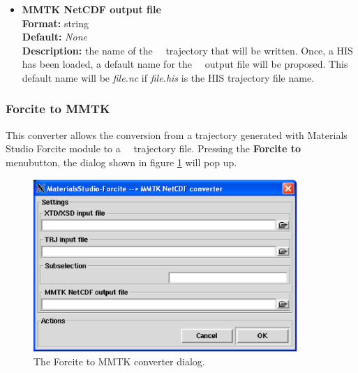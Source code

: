 \documentclass[a4paper,11pt]{report}
\begin{document}
\begin{itemize}
\item \textbf{MMTK NetCDF output file}\\
\textbf{Format:} string\\
\textbf{Default:} \textit{None}\\
\textbf{Description:} the name of the \MMTK\ \NetCDF\ trajectory that will be written. Once, a HIS has been 
loaded, a default name for the \MMTK\ \NetCDF\ output file will be proposed. This default name will be 
\textit{file.nc} if \textit{file.his} is the HIS trajectory file name.
\end{itemize}

\subsubsection{Forcite to MMTK}
\label{forcite_to_mmtk}
This converter allows the conversion from a trajectory generated with Materials Studio Forcite module \cite{Forcite} to a 
\MMTK\ \NetCDF\ trajectory file. Pressing the \textbf{Forcite to \MMTK\ } menubutton, the dialog shown in figure \ref{fig:forcite_converter} will pop up.
\begin{figure}[h!]
\begin{center}
\includegraphics[width=10cm]{Figures/forcite_converter.eps}
\end{center}
\caption[The Forcite to MMTK converter dialog]{The Forcite to MMTK converter dialog.}
\label{fig:forcite_converter}
\end{figure}   
\end{document}
